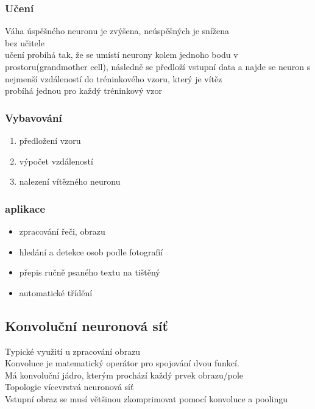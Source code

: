 \subsubsection*{Učení}
Váha úspěšného neuronu je zvýšena, neúspěšných je snížena\\
bez učitele\\
učení probíhá tak, že se umístí neurony kolem jednoho bodu v prostoru(grandmother cell), následně se předloží vstupní data a najde se neuron s nejmenší vzdáleností do tréninkového vzoru, který je vítěz\\
probíhá jednou pro každý tréninkový vzor\\

\subsubsection*{Vybavování}
\begin{enumerate}
    \item předložení vzoru
    \item výpočet vzdáleností
    \item nalezení vítězného neuronu
\end{enumerate}

\subsubsection*{aplikace}
\begin{itemize}
    \item zpracování řeči, obrazu
    \item hledání a detekce osob podle fotografií
    \item přepis ručně psaného textu na tištěný
    \item automatické třídění 
\end{itemize}
\newpage

\subsection*{Konvoluční neuronová síť}
Typické využití u zpracování obrazu\\
Konvoluce je matematický operátor pro spojování dvou funkcí.\\
Má konvoluční jádro, kterým prochází každý prvek obrazu/pole\\
Topologie vícevrstvá neuronová síť\\
Vstupní obraz se musí většinou zkomprimovat pomocí konvoluce a poolingu\\

